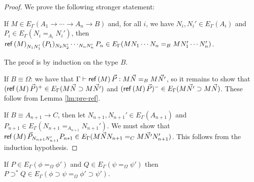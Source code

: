 \begin{proof}
We prove the following stronger statement:

If $M \in E_\Gamma(A_1 \rightarrow \cdots \rightarrow A_n \rightarrow B)$ and, for all $i$, we have
$N_i, N_i' \in E_\Gamma(A_i)$ and $P_i \in E_\Gamma(N_i =_{A_i} N_i')$, then $\mathsf{ref} \left( {M} \right)_{N_1 N_1'} (P_1)_{N_2 N_2'}
\cdots_{N_n N_n'} P_n \in E_\Gamma(M N_1 \cdots N_n =_B M N_1' \cdots N_n')$.

The proof is by induction on the type $B$.

If $B \equiv \Omega$: we have that $\Gamma \vdash \mathsf{ref} \left( {M} \right) \vec{P} : M \vec{N} =_B M \vec{N'}$, so it remains
to show that $(\mathsf{ref} \left( {M} \right) \vec{P})^+ \in E_\Gamma(M \vec{N} \supset M \vec{N'})$ and $(\mathsf{ref} \left( {M} \right) \vec{P})^- \in E_\Gamma(M \vec{N'} \supset
M \vec{N})$.  These follow from Lemma \ref{lm:pre-ref}.

If $B \equiv A_{n+1} \rightarrow C$, then let $N_{n+1}, N_{n+1}' \in E_\Gamma(A_{n+1})$ and \\
$P_{n+1} \in E_\Gamma(N_{n+1} =_{A_{n+1}} N_{n+1}')$.  We must show that
$\mathsf{ref} \left( {M} \right) \vec{P}_{N_{n+1} N_{n+1}'} P_{n*1} \in E_\Gamma(M \vec{N} N_{n+1} =_C M \vec{N'} N_{n+1}')$.  This follows
from the induction hypothesis.
\end{proof}

\begin{lm}
\label{lm:Esupset}
If $P \in E_\Gamma(\phi =_\Omega \phi')$ and $Q \in E_\Gamma(\psi =_\Omega \psi')$ then
$P \supset^* Q \in E_\Gamma(\phi \supset \psi =_\Omega \phi' \supset \psi')$.
\end{lm}

